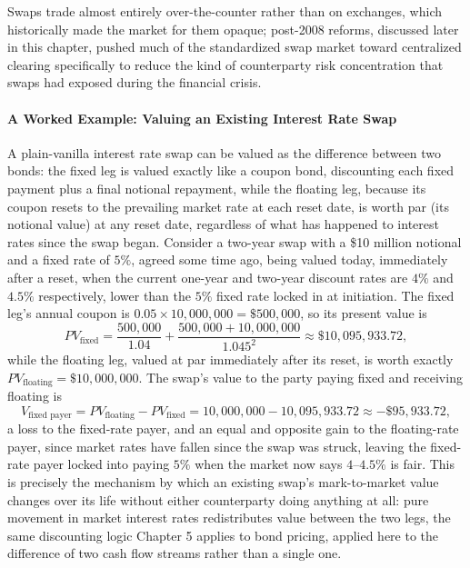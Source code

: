 \documentclass[../ai_in_finance]{subfiles}
\begin{document}
Swaps trade almost entirely over-the-counter rather than on exchanges, which historically made the market for them opaque; post-2008 reforms, discussed later in this chapter, pushed much of the standardized swap market toward centralized clearing specifically to reduce the kind of counterparty risk concentration that swaps had exposed during the financial crisis.

\paragraph{A Worked Example: Valuing an Existing Interest Rate Swap}

A plain-vanilla interest rate swap can be valued as the difference between two bonds: the fixed leg is valued exactly like a coupon bond, discounting each fixed payment plus a final notional repayment, while the floating leg, because its coupon resets to the prevailing market rate at each reset date, is worth par (its notional value) at any reset date, regardless of what has happened to interest rates since the swap began. Consider a two-year swap with a \$10 million notional and a fixed rate of $5\%$, agreed some time ago, being valued today, immediately after a reset, when the current one-year and two-year discount rates are $4\%$ and $4.5\%$ respectively, lower than the $5\%$ fixed rate locked in at initiation. The fixed leg's annual coupon is $0.05 \times 10{,}000{,}000 = \$500{,}000$, so its present value is
\begin{equation*}
PV_{\text{fixed}} = \frac{500{,}000}{1.04} + \frac{500{,}000 + 10{,}000{,}000}{1.045^2} \approx \$10{,}095{,}933.72,
\end{equation*}
while the floating leg, valued at par immediately after its reset, is worth exactly $PV_{\text{floating}} = \$10{,}000{,}000$. The swap's value to the party paying fixed and receiving floating is
\begin{equation*}
V_{\text{fixed payer}} = PV_{\text{floating}} - PV_{\text{fixed}} = 10{,}000{,}000 - 10{,}095{,}933.72 \approx -\$95{,}933.72,
\end{equation*}
a loss to the fixed-rate payer, and an equal and opposite gain to the floating-rate payer, since market rates have fallen since the swap was struck, leaving the fixed-rate payer locked into paying $5\%$ when the market now says $4$--$4.5\%$ is fair. This is precisely the mechanism by which an existing swap's mark-to-market value changes over its life without either counterparty doing anything at all: pure movement in market interest rates redistributes value between the two legs, the same discounting logic Chapter 5 applies to bond pricing, applied here to the difference of two cash flow streams rather than a single one.
\end{document}
